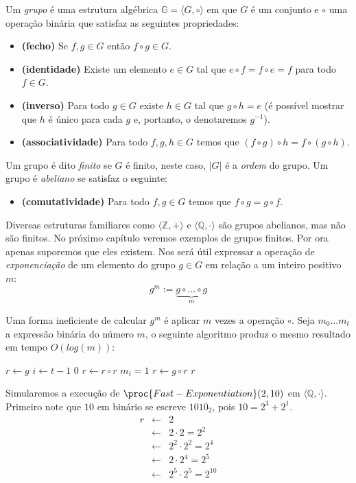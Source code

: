 Um {\em grupo} é uma estrutura algébrica $\mathbb{G} = \langle G, \circ \rangle$ em que $G$ é um conjunto e $\circ$ uma operação binária que satisfaz as seguintes propriedades:
\begin{itemize}
\item[] {\bf (fecho)} Se $f, g \in G$ então $f \circ g \in G$.
\item[] {\bf (identidade)} Existe um elemento $e \in G$ tal que $e \circ f = f \circ e = f$ para todo $f \in G$.
\item[] {\bf (inverso)} Para todo $g \in G$ existe $h \in G$ tal que $g \circ h = e$ (é possível mostrar que $h$ é único para cada $g$ e, portanto, o denotaremos $g^{-1}$).
\item[] {\bf (associatividade)} Para todo $f,g,h \in G$ temos que $(f \circ g) \circ h = f \circ (g \circ h)$. 
\end{itemize}

Um grupo é dito {\em finito} se $G$ é finito, neste caso, $|G|$ é a {\em ordem} do grupo.
Um grupo é {\em abeliano} se satisfaz o seguinte:
\begin{itemize}
\item[] {\bf (comutatividade)} Para todo $f, g \in G$ temos que $f \circ g = g \circ f$.
\end{itemize}
 
Diversas estruturas familiares como $\langle \mathbb{Z}, + \rangle$ e $\langle \mathbb{Q}, \cdot \rangle$ são grupos abelianos, mas não são finitos.
No próximo capítulo veremos exemplos de grupos finitos.
Por ora apenas suporemos que eles existem.
Nos será útil expressar a operação de {\em exponenciação} de um elemento do grupo $g \in G$ em relação a um inteiro positivo $m$:
\begin{displaymath}
  g^m := \underbrace{g \circ \dots \circ g}_m
\end{displaymath}

Uma forma ineficiente de calcular $g^m$ é aplicar $m$ vezes a operação $\circ$.
Seja $m_0 \dots m_t$ a expressão binária do número $m$, o seguinte algoritmo produz o mesmo resultado em tempo $O(log(m))$:


\begin{codebox}
\li $r \gets g$
\li \For $i \gets t-1$ \To $0$
\li \Do $r \gets r \circ r$
\li \If $m_i = 1$ 
\li \Then $r \gets g \circ r$
\End
\End
\li \Return $r$
\End
\end{codebox}


\begin{example}
  Simularemos a execução de $\proc{Fast-Exponentiation}(2, 10)$ em $\langle \mathbb{Q}, \cdot \rangle$.
  Primeiro note que $10$ em binário se escreve $1010_2$, pois $10 = 2^3 + 2^1$.
  \begin{eqnarray*}
    r & \gets & 2\\
      & \gets & 2 \cdot 2 = 2^2\\
      & \gets & 2^2 \cdot 2^2 = 2^4\\
      & \gets & 2 \cdot 2^4 = 2^5\\
      & \gets & 2^5 \cdot 2^5 = 2^{10} 
  \end{eqnarray*}
\end{example}



